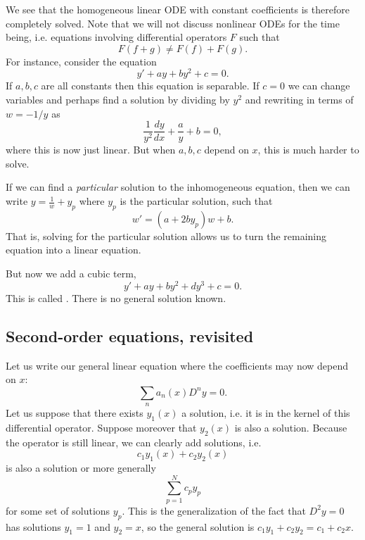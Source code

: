 We see that the homogeneous linear ODE with constant coefficients is therefore completely solved. Note that we will not discuss nonlinear ODEs for the time being, i.e. equations involving differential operators $F$ such that
\begin{equation}
    F(f+g) \neq F(f) + F(g).
\end{equation}
For instance, consider the equation
\begin{equation}
    y' + ay + by^2 +c=0.
\end{equation}
If $a,b,c$ are all constants then this equation is separable. If $c=0$ we can change variables and perhaps find a solution by dividing by $y^2$ and rewriting in terms of $w=-1/y$ as
\begin{equation}
    \frac{1}{y^2} \frac{dy}{dx} + \frac{a}{y} + b =0,
\end{equation}
where this is now just linear. But when $a,b,c$ depend on $x$, this is much harder to solve.

If we can find a \emph{particular} solution to the inhomogeneous equation, then we can write $y=\frac{1}{w} + y_p$ where $y_p$ is the particular solution, such that
\begin{equation}
    w'=(a+ 2b y_p) w+b.
\end{equation}
That is, solving for the particular solution allows us to turn the remaining equation into a linear equation.

But now we add a cubic term,
\begin{equation}
    y' + ay + by^2 + dy^3 + c=0.
\end{equation}
This is called . There is no general solution known.

\subsection*{Second-order equations, revisited}
Let us write our general linear equation where the coefficients may now depend on $x$:
\begin{equation}
    \sum_n a_n(x) D^n y =0.
\end{equation}
Let us suppose that there exists $y_1(x)$ a solution, i.e. it is in the kernel of this differential operator. Suppose moreover that $y_2(x)$ is also a solution. Because the operator is still linear, we can clearly add solutions, i.e.
\begin{equation}
     c_1 y_1(x) + c_2 y_2(x)
\end{equation}
is also a solution or more generally
\begin{equation}
    \sum_{p=1}^N c_p y_p
\end{equation}
for some set of solutions $y_p$. This is the generalization of the fact that $D^2y=0$ has solutions $y_1=1$ and $y_2=x$, so the general solution is $c_1 y_1 + c_2 y_2 = c_1 + c_2x$.

